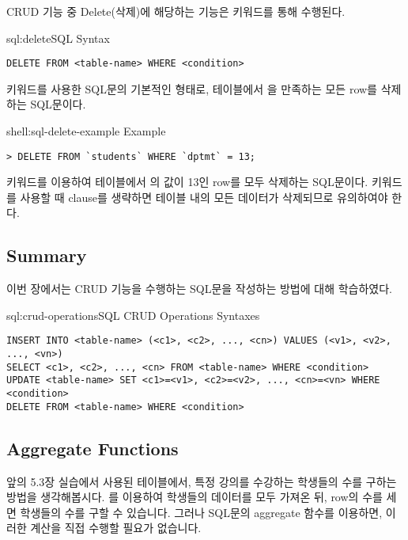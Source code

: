 CRUD 기능 중 Delete(삭제)에 해당하는 기능은  키워드를 통해 수행된다.

\begin{sqlenv}{sql:delete}{SQL  Syntax}\begin{verbatim}
DELETE FROM <table-name> WHERE <condition>
\end{verbatim}
\end{sqlenv}

\는  키워드를 사용한 SQL문의 기본적인 형태로,  테이블에서 을 만족하는 모든 row를 삭제하는 SQL문이다.

\begin{shellenv}{shell:sql-delete-example}{ Example}\begin{verbatim}
> DELETE FROM `students` WHERE `dptmt` = 13;
\end{verbatim}
\end{shellenv}

\은  키워드를 이용하여  테이블에서 의 값이 13인 row를 모두 삭제하는 SQL문이다.  키워드를 사용할 때  clause를 생략하면 테이블 내의 모든 데이터가 삭제되므로 유의하여야 한다.

\subsection*{Summary}

이번 장에서는 CRUD 기능을 수행하는 SQL문을 작성하는 방법에 대해 학습하였다.

\begin{sqlenv}{sql:crud-operations}{SQL CRUD Operations Syntaxes}\begin{verbatim}
INSERT INTO <table-name> (<c1>, <c2>, ..., <cn>) VALUES (<v1>, <v2>, ..., <vn>)
SELECT <c1>, <c2>, ..., <cn> FROM <table-name> WHERE <condition>
UPDATE <table-name> SET <c1>=<v1>, <c2>=<v2>, ..., <cn>=<vn> WHERE <condition>
DELETE FROM <table-name> WHERE <condition>
\end{verbatim}
\end{sqlenv}

\subsection*{Aggregate Functions}

앞의 5.3장 실습에서 사용된 테이블에서, 특정 강의를 수강하는 학생들의 수를 구하는 방법을 생각해봅시다. 를 이용하여 학생들의 데이터를 모두 가져온 뒤, row의 수를 세면 학생들의 수를 구할 수 있습니다. 그러나 SQL문의 aggregate 함수를 이용하면, 이러한 계산을 직접 수행할 필요가 없습니다.

